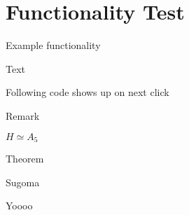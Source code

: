 \section{Functionality Test}

\begin{frame}{Example functionality}

\par Text 
\pause
\par Following code shows up on next click

\begin{block}{Remark}
    \par $H \simeq A_5$
\end{block}
\begin{alertblock}{Theorem}
    \par Sugoma
\end{alertblock}
\begin{examples}
    \par Yoooo
\end{examples}

\end{frame}